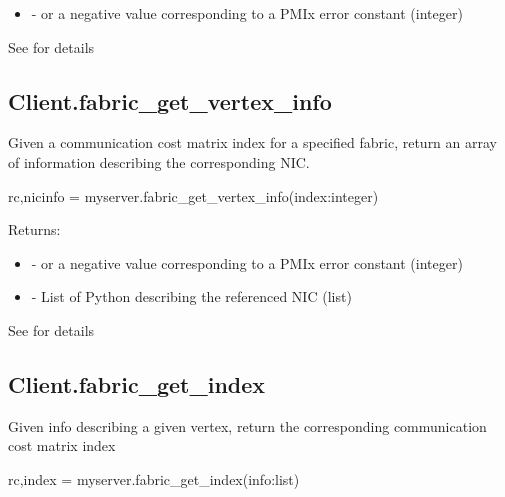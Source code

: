 \begin{itemize}
    \item {} -  or a negative value corresponding to a PMIx error constant (integer)
\end{itemize}


See  for details


\subsection{Client.fabric_get_vertex_info}

\summary
Given a communication cost matrix index for a specified fabric, return an array of information describing the corresponding \ac{NIC}.

\format

\pyspecificstart
\begin{codepar}
rc,nicinfo = myserver.fabric_get_vertex_info(index:integer)
\end{codepar}
\pyspecificend


Returns:

\begin{itemize}
    \item {} -  or a negative value corresponding to a PMIx error constant (integer)
    \item {} - List of Python  describing the referenced \ac{NIC} (list)
\end{itemize}


See  for details


\subsection{Client.fabric_get_index}

\summary
Given info describing a given vertex, return the corresponding communication cost matrix index

\format

\pyspecificstart
\begin{codepar}
rc,index = myserver.fabric_get_index(info:list)
\end{codepar}
\pyspecificend

